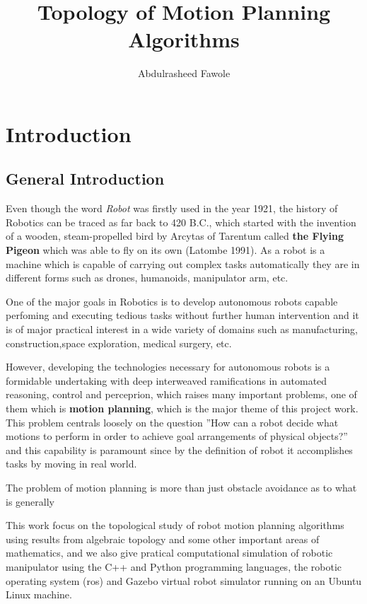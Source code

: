 \documentclass[a4paper, 12pt]{scrbook}
\title{Topology of Motion Planning Algorithms}
\author{Abdulrasheed Fawole}
\theoremstyle{definition}
\begin{document}
\baselineskip24pt
    \chapter{Introduction}
    \section{General Introduction}
    Even though the word \textit{Robot} was firstly used in the year 1921, the history of Robotics can be traced as far back to 420 B.C., which started with the invention of a wooden, steam-propelled bird by Arcytas of Tarentum called \textbf{the Flying Pigeon} which was able to fly on its own (Latombe 1991).
    As a robot is a machine which is capable of carrying out complex tasks automatically they are in different forms such as drones, humanoids, manipulator arm, etc.

    One of the major goals in Robotics is to develop autonomous robots capable perfoming and executing tedious tasks without further human intervention and it is of major practical interest in a wide variety of domains such as manufacturing, construction,space exploration, medical surgery, etc.

    However, developing the technologies necessary for autonomous robots is a formidable undertaking with deep interweaved ramifications in automated reasoning, control and perceprion, which raises many important problems, one of them which is \textbf{motion planning}, which is the major theme of this project work. This problem centrals loosely on the question ''How can a robot decide what motions to perform in order to achieve goal arrangements of physical objects?'' and this capability is paramount since by the definition of robot it accomplishes tasks by moving in real world.
   
    The problem of motion planning is more than just obstacle avoidance as to what is generally 

    This work focus on the topological study of robot motion planning algorithms using results from algebraic topology and some other important areas of mathematics, and we also give pratical computational simulation of robotic manipulator using the C++ and Python programming languages, the robotic operating system (ros) and Gazebo virtual robot simulator running on an Ubuntu Linux machine.
    
\end{document}
